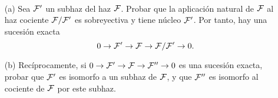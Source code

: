 \documentclass[twoside]{article}
\begin{document}
\newpage

\begin{ejercicio}{1.6}\
\begin{enumerate}
\item[(a)]
Sea $\mathcal{F}'$ un subhaz del haz $\mathcal{F}$. Probar que la aplicación natural de $\mathcal{F}$ al haz cociente $\mathcal{F}/\mathcal{F}'$ es sobreyectiva y tiene núcleo $\mathcal{F}'$. Por tanto, hay una sucesión exacta 
\[
0\to \mathcal{F}'\to\mathcal{F}\to \mathcal{F}/\mathcal{F}'\to 0.
\]

\item[(b)] Recíprocamente, si $0\to \mathcal{F}'\to\mathcal{F}\to \mathcal{F}''\to 0$ es una sucesión exacta, probar que $\mathcal{F}'$ es isomorfo a un subhaz de $\mathcal{F}$, y que $\mathcal{F}''$ es isomorfo al cociente de $\mathcal{F}$ por este subhaz.
\end{enumerate}
\end{ejercicio}
\end{document}
